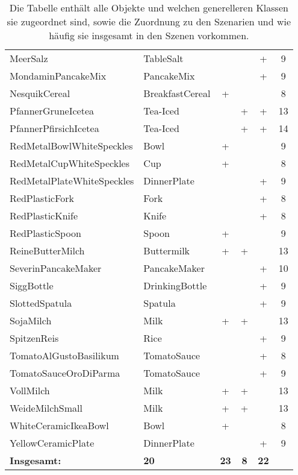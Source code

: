 \begin{table}
\begin{tabularx}{\textwidth}{llcccc}
MeerSalz						& TableSalt			& 			& 			&	+		& 9	\\
MondaminPancakeMix				& PancakeMix		& 			& 			&	+		& 9	\\
NesquikCereal					& BreakfastCereal	& +			& 			&			& 8	\\
PfannerGruneIcetea				& Tea-Iced			& 			& +			&	+		& 13	\\
PfannerPfirsichIcetea			& Tea-Iced			& 			& +			&	+		& 14	\\
RedMetalBowlWhiteSpeckles		& Bowl				& +			& 			&			& 9	\\
RedMetalCupWhiteSpeckles		& Cup				& +			& 			&			& 8	\\
RedMetalPlateWhiteSpeckles		& DinnerPlate		& 			& 			&	+		& 9	\\
RedPlasticFork					& Fork				& 			& 			&	+		& 8	\\
RedPlasticKnife					& Knife				& 			& 			&	+		& 8	\\
RedPlasticSpoon					& Spoon				& +			& 			&			& 9	\\
ReineButterMilch				& Buttermilk		& +			& +			&			& 13	\\
SeverinPancakeMaker				& PancakeMaker		& 			& 			&	+		& 10	\\
SiggBottle						& DrinkingBottle	& 			& 			&	+		& 9	\\
SlottedSpatula					& Spatula			& 			& 			&	+		& 9	\\
SojaMilch						& Milk				& +			& +			&			& 13	\\
SpitzenReis						& Rice				& 			& 			&	+		& 9	\\
TomatoAlGustoBasilikum			& TomatoSauce		& 			& 			&	+		& 8	\\
TomatoSauceOroDiParma			& TomatoSauce		& 			& 			&	+		& 9	\\
VollMilch						& Milk				& +			& +			&			& 13	\\
WeideMilchSmall					& Milk				& +			& +			&			& 13	\\
WhiteCeramicIkeaBowl			& Bowl				& +			& 			&			& 8	\\
YellowCeramicPlate				& DinnerPlate 	    & 			& 			&	+		& 9	\\ \hline
\textbf{Insgesamt:}				& \textbf{20}		& \textbf{23} & \textbf{8} & \textbf{22} & 	\\
\end{tabularx}
\caption[Objekte]{Die Tabelle enthält alle Objekte und welchen generelleren Klassen sie zugeordnet sind, sowie die Zuordnung zu den Szenarien und wie häufig sie insgesamt in den Szenen vorkommen.}
\label{tab:unrealObjects}
\end{table}
